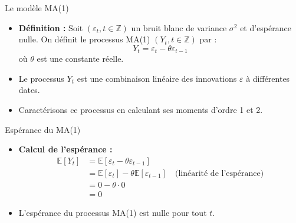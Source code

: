 \documentclass[11pt,aspectratio=169]{beamer}
\newcommand{\E}{\mathbb{E}}
\newcommand{\Z}{\mathbb{Z}}
\begin{document}
\begin{frame}{Le modèle MA(1)}

\begin{itemize}

\item \textbf{Définition :} Soit $(\varepsilon_t, t \in \Z)$ un bruit blanc de variance $\sigma^2$ et d'espérance nulle. On définit le processus MA(1) $(Y_t, t \in \Z)$ par :
\[
Y_t = \varepsilon_t - \theta \varepsilon_{t-1}
\]
où $\theta$ est une constante réelle.\newline

\item Le processus $Y_t$ est une combinaison linéaire des innovations $\varepsilon$ à différentes dates.\newline

\item Caractérisons ce processus en calculant ses moments d'ordre 1 et 2.

\end{itemize}
\end{frame}

\begin{frame}{Espérance du MA(1)}

\begin{itemize}

\item \textbf{Calcul de l'espérance :}
\begin{align*}
\E[Y_t] &= \E[\varepsilon_t - \theta \varepsilon_{t-1}] \\
&= \E[\varepsilon_t] - \theta \E[\varepsilon_{t-1}] \quad \text{(linéarité de l'espérance)} \\
&= 0 - \theta \cdot 0 \\
&= 0
\end{align*}

\item L'espérance du processus MA(1) est nulle pour tout $t$.

\end{itemize}
\end{frame}
\end{document}

